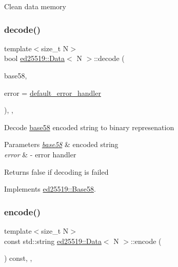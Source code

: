 Clean data memory \mbox{\label{classed25519_1_1_data_a281d932d3c3fe7fd40ce86ea7eff559b}} 
\subsubsection{\texorpdfstring{decode()}{decode()}}
{\footnotesize\ttfamily template$<$size\+\_\+t N$>$ \\
bool \mbox{\hyperlink{classed25519_1_1_data}{ed25519\+::\+Data}}$<$ N $>$\+::decode (\begin{DoxyParamCaption}\item[{const std\+::string \&}]{base58,  }\item[{const \mbox{\hyperlink{namespaceed25519_a6ba572942b3c18591fc869d52a6b16e6}{Error\+Handler}} \&}]{error = {\ttfamily \mbox{\hyperlink{namespaceed25519_a7c7bb6ed17541162959c33ed3e3b15fb}{default\+\_\+error\+\_\+handler}}} }\end{DoxyParamCaption})\hspace{0.3cm}{\ttfamily [inline]}, {\ttfamily [override]}, {\ttfamily [virtual]}}

Decode \mbox{\hyperlink{namespaceed25519_1_1base58}{base58}} encoded string to binary represenation 
\begin{DoxyParams}{Parameters}
{\em \mbox{\hyperlink{namespaceed25519_1_1base58}{base58}}} & encoded string \\
\hline
{\em error} & -\/ error handler \\
\hline
\end{DoxyParams}
\begin{DoxyReturn}{Returns}
false if decoding is failed 
\end{DoxyReturn}


Implements \mbox{\hyperlink{classed25519_1_1_base58_a3cb74be32923dcfb03a24b65015bee84}{ed25519\+::\+Base58}}.

\mbox{\label{classed25519_1_1_data_a2dc2e23b950a10b168d7509a63ffca53}} 
\subsubsection{\texorpdfstring{encode()}{encode()}}
{\footnotesize\ttfamily template$<$size\+\_\+t N$>$ \\
const std\+::string \mbox{\hyperlink{classed25519_1_1_data}{ed25519\+::\+Data}}$<$ N $>$\+::encode (\begin{DoxyParamCaption}{ }\end{DoxyParamCaption}) const\hspace{0.3cm}{\ttfamily [inline]}, {\ttfamily [override]}, {\ttfamily [virtual]}}

